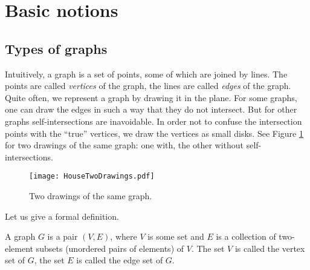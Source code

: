 \begin{page}
\setcounter{section}{1}
\setcounter{subsection}{1}
\setcounter{dfn}{0}
\label{portion:169}

\section{Basic notions}

\end{page}

\begin{page}
\setcounter{section}{1}
\setcounter{subsection}{1}
\setcounter{dfn}{0}
\label{portion:171}

\subsection{Types of graphs}
Intuitively, a graph is a set of points, some of which are joined by lines.
The points are called \emph{vertices} of the graph, the lines are called \emph{edges} of the graph.
Quite often, we represent a graph by drawing it in the plane.
For some graphs, one can draw the edges in such a way that they do not intersect.
But for other graphs self-intersections are inavoidable.
In order not to confuse the intersection points with the ``true'' vertices, we draw the vertices as small disks.
See Figure \ref{fig:TwoDrawings} for two drawings of the same graph: one with, the other without self-intersections.

\begin{figure}[ht]
\begin{center}
\texttt{[image: HouseTwoDrawings.pdf]}
\end{center}
\caption{Two drawings of the same graph.}
\label{fig:TwoDrawings}
\end{figure}

Let us give a formal definition.

\end{page}

\begin{page}
\setcounter{section}{1}
\setcounter{subsection}{1}
\setcounter{dfn}{1}
\label{portion:173}

\begin{dfn}
\label{dfn:Graph}
A graph $G$ is a pair $(V,E)$, where $V$ is some set and $E$ is a collection of two-element subsets (unordered pairs of elements) of $V$.
The set $V$ is called the vertex set of $G$, the set $E$ is called the edge set of $G$.
\end{dfn}

\end{page}


